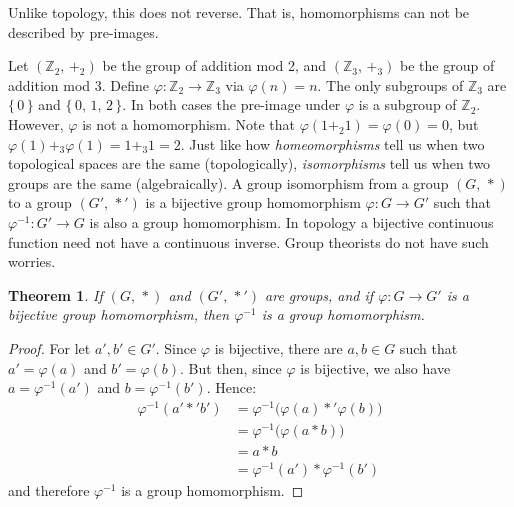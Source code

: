 \documentclass{article}
\theoremstyle{plain}
\newtheorem{theorem}{Theorem}[section]
\theoremstyle{normal}
\newenvironment{example}{%
    \pushQED{\qed}\renewcommand{\qedsymbol}{$\blacksquare$}\examplex%
}{%
    \popQED\endexamplex%
}
\newenvironment{definition}{%
    \pushQED{\qed}\renewcommand{\qedsymbol}{$\blacksquare$}\definitionx%
}{%
    \popQED\enddefinitionx%
}
\begin{document}
        Unlike topology, this does not reverse. That is, homomorphisms can not
        be described by pre-images.
        \begin{example}
            Let $(\mathbb{Z}_{2},\,+_{2})$ be the group of addition mod 2, and
            $(\mathbb{Z}_{3},\,+_{3})$ be the group of addition mod 3.
            Define $\varphi:\mathbb{Z}_{2}\rightarrow\mathbb{Z}_{3}$ via
            $\varphi(n)=n$. The only subgroups of $\mathbb{Z}_{3}$ are
            $\{\,0\,\}$ and $\{\,0,\,1,\,2\,\}$. In both cases
            the pre-image under $\varphi$ is a subgroup of $\mathbb{Z}_{2}$.
            However, $\varphi$ is not a homomorphism. Note that
            $\varphi(1+_{2}1)=\varphi(0)=0$, but
            $\varphi(1)+_{3}\varphi(1)=1+_{3}1=2$.
        \end{example}
        Just like how \textit{homeomorphisms} tell us when two topological
        spaces are the same (topologically), \textit{isomorphisms} tell us when
        two groups are the same (algebraically).
        \begin{definition}[\textbf{Group Isomorphism}]
            A group isomorphism from a group $(G,\,*)$ to a group
            $(G',\,*')$ is a bijective group homomorphism
            $\varphi:G\rightarrow{G}'$ such that
            $\varphi^{-1}:G'\rightarrow{G}$ is also a group homomorphism.
        \end{definition}
        In topology a bijective continuous function need not have a continuous
        inverse. Group theorists do not have such worries.
        \begin{theorem}
            If $(G,\,*)$ and $(G',\,*')$ are groups, and if
            $\varphi:G\rightarrow{G}'$ is a bijective group homomorphism,
            then $\varphi^{-1}$ is a group homomorphism.
        \end{theorem}
        \begin{proof}
            For let $a',b'\in{G}'$. Since $\varphi$ is bijective, there are
            $a,b\in{G}$ such that $a'=\varphi(a)$ and $b'=\varphi(b)$. But then,
            since $\varphi$ is bijective, we also have
            $a=\varphi^{-1}(a')$ and $b=\varphi^{-1}(b')$. Hence:
            \begin{align}
                \varphi^{-1}(a'*'b')
                &=\varphi^{-1}\big(\varphi(a)*'\varphi(b)\big)
                    \tag{Substitution}\\
                &=\varphi^{-1}\big(\varphi(a*b)\big)\tag{Homomorphism}\\
                &=a*b\tag{Inverse Function}\\
                &=\varphi^{-1}(a')*\varphi^{-1}(b')\tag{Substitution}
            \end{align}
            and therefore $\varphi^{-1}$ is a group homomorphism.
        \end{proof}
\end{document}
